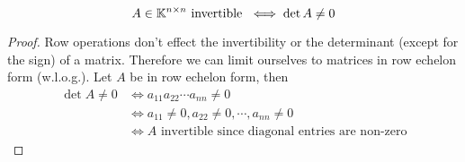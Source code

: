 \documentclass[../../script.tex]{subfiles}
\begin{document}
\begin{cor}
    \[
        A \in \mathbb{K}^{n \times n} \text{ invertible } \iff \det A \ne 0   
    \]
\end{cor}
\begin{proof}
    Row operations don't effect the invertibility or the determinant (except for the sign) of a matrix. Therefore we can limit ourselves to matrices in 
    row echelon form (w.l.o.g.). Let $A$ be in row echelon form, then 
    \begin{equation}
        \begin{split}
            \det A \ne 0 &\iff a_{11} a_{22} \cdots a_{nn} \ne 0 \\
            &\iff a_{11} \ne 0, a_{22} \ne 0, \cdots, a_{nn} \ne 0 \\
            &\iff A \text{ invertible since diagonal entries are non-zero}
        \end{split}
    \end{equation}
\end{proof}
\end{document}
